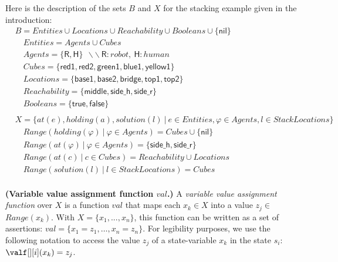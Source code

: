 Here is the description of the sets $B$ and $X$ for the stacking example given in the introduction:
{\small
\begin{align*}
&B           = Entities \cup Locations \cup Reachability \cup Booleans \cup \{\textsf{nil}\} \\
&\quad Entities    = Agents \cup Cubes\\
&\quad Agents      = \{ \textsf{R}, \textsf{H} \} ~~ \backslash\backslash~\textsf{R}:robot,~\textsf{H}:human\\
&\quad Cubes     = \{ \textsf{red1}, \textsf{red2}, \textsf{green1}, \textsf{blue1}, \textsf{yellow1} \}\\
&\quad Locations     = \{ \textsf{base1}, \textsf{base2}, \textsf{bridge}, \textsf{top1}, \textsf{top2} \}\\
&\quad Reachability     = \{ \textsf{middle}, \textsf{side\_h}, \textsf{side\_r} \}\\
&\quad Booleans    = \{ \textsf{true},\textsf{false} \}\\
&\\
&X = \{ at(e), holding(a), solution(l) ~ | ~ e \in Entities, \varphi \in Agents, l \in StackLocations\}\\
&\quad \textit{Range}(holding(\varphi) ~|~ \varphi \in Agents) = Cubes \cup \{\textsf{nil}\} \\
&\quad \textit{Range}(at(\varphi) ~|~ \varphi \in Agents) = \{ \textsf{side\_h}, \textsf{side\_r} \}\\
&\quad \textit{Range}(at(c) ~|~ c \in Cubes) = Reachability \cup Locations\\
&\quad \textit{Range}(solution(l) ~|~ l \in StackLocations) = Cubes \\
\end{align*}
}



\begin{definition}
    \textbf{(Variable value assignment function $val$.)} A \emph{variable value assignment function} over $X$ is a function $val$ that maps each $x_k \in X$ into a value $z_j \in$ $\textit{Range}(x_k)$.
    With $X = \{ x_1, ..., x_n \}$, this function can be written as a set of assertions: $val = \{ x_1=z_1, \ldots, x_n=z_n \}$. 
    For legibility purposes, we use the following notation to access the value $z_j$ of a state-variable $x_k$ in the state $s_i$: $\valf[][i](x_k) = z_j$.
    \label{def:variable_value_assignment_function}
\end{definition}


